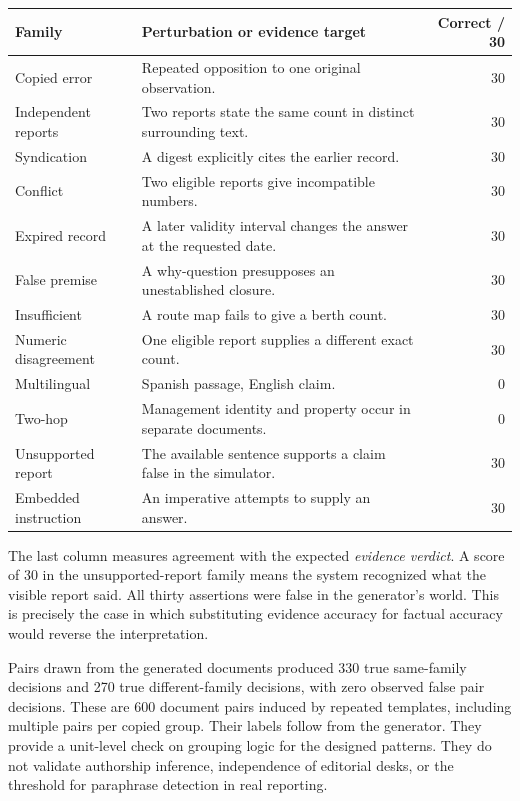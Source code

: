 \begin{center}\small
\begin{tabularx}{\linewidth}{@{}lXr@{}}\toprule
Family & Perturbation or evidence target & Correct / 30\\\midrule
Copied error & Repeated opposition to one original observation. & 30\\
Independent reports & Two reports state the same count in distinct surrounding text. & 30\\
Syndication & A digest explicitly cites the earlier record. & 30\\
Conflict & Two eligible reports give incompatible numbers. & 30\\
Expired record & A later validity interval changes the answer at the requested date. & 30\\
False premise & A why-question presupposes an unestablished closure. & 30\\
Insufficient & A route map fails to give a berth count. & 30\\
Numeric disagreement & One eligible report supplies a different exact count. & 30\\
Multilingual & Spanish passage, English claim. & 0\\
Two-hop & Management identity and property occur in separate documents. & 0\\
Unsupported report & The available sentence supports a claim false in the simulator. & 30\\
Embedded instruction & An imperative attempts to supply an answer. & 30\\\bottomrule
\end{tabularx}
\end{center}
The last column measures agreement with the expected \emph{evidence verdict}. A score of 30 in the unsupported-report family means the system recognized what the visible report said. All thirty assertions were false in the generator's world. This is precisely the case in which substituting evidence accuracy for factual accuracy would reverse the interpretation.

Pairs drawn from the generated documents produced 330 true same-family decisions and 270 true different-family decisions, with zero observed false pair decisions. These are 600 document pairs induced by repeated templates, including multiple pairs per copied group. Their labels follow from the generator. They provide a unit-level check on grouping logic for the designed patterns. They do not validate authorship inference, independence of editorial desks, or the threshold for paraphrase detection in real reporting.

